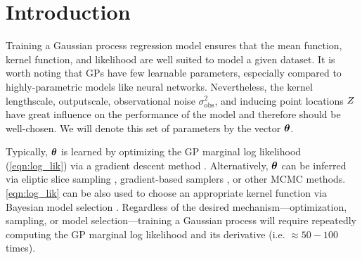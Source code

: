\section{Introduction}

Training a Gaussian process regression model ensures that the mean function, kernel function, and likelihood are well suited to model a given dataset.
It is worth noting that GPs have few learnable parameters, especially compared to highly-parametric models like neural networks.
Nevertheless, the kernel lengthscale, outputscale, observational noise $\sigma^2_\text{obs}$, and inducing point locations $Z$ have great influence on the performance of the model and therefore should be well-chosen.
We will denote this set of parameters by the vector $\boldsymbol{\theta}$.

Typically, $\boldsymbol{\theta}$ is learned by optimizing the GP marginal log likelihood (\cref{eqn:log_lik}) via a gradient descent method \cite{rasmussen2006gaussian}.
Alternatively, $\boldsymbol{\theta}$ can be inferred via eliptic slice sampling \cite{murray2010elliptical}, gradient-based samplers \cite{havasi2018inference}, or other MCMC methods.
\cref{eqn:log_lik} can be also used to choose an appropriate kernel function via Bayesian model selection \cite{rasmussen2006gaussian,duvenaud2013structure}.
Regardless of the desired mechanism---optimization, sampling, or model selection---training a Gaussian process will require repeatedly computing the GP marginal log likelihood and its derivative (i.e. $\approx50-100$ times).



